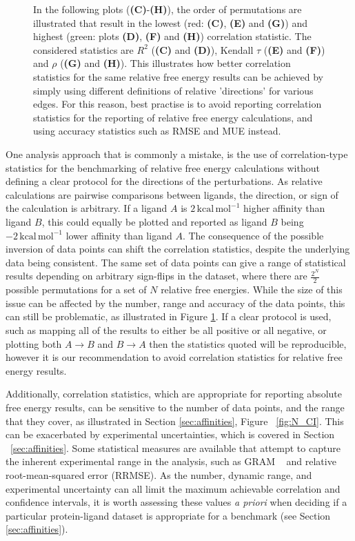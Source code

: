 \documentclass[9pt,bestpractices]{livecoms}
\begin{document}
\begin{figure}
{    %
    In the following plots (\textbf{(C)}-\textbf{(H)}), the order of permutations are illustrated that result in the lowest (red: \textbf{(C)}, \textbf{(E)} and \textbf{(G)}) and highest (green: plots \textbf{(D)}, \textbf{(F)} and \textbf{(H)}) correlation statistic. 
    The considered statistics are $R^2$ (\textbf{(C)} and \textbf{(D)}), Kendall $\tau$ (\textbf{(E)} and \textbf{(F)}) and $\rho$ (\textbf{(G)} and \textbf{(H)}).
    This illustrates how better correlation statistics for the same relative free energy results can be achieved by simply using different definitions of relative 'directions' for various edges. 
    For this reason, best practise is to avoid reporting correlation statistics for the reporting of relative free energy calculations, and using accuracy  statistics such as RMSE and MUE instead.}
    \label{fig:changing-corr}
\end{figure}

One analysis approach that is commonly a mistake, is the use of correlation-type statistics for the benchmarking of relative free energy calculations without defining a clear protocol for the directions of the perturbations. As relative calculations are pairwise comparisons between ligands, the direction, or sign of the calculation is arbitrary. If a ligand $A$ is $2\,\mathrm{kcal\,mol^{-1}}$ higher affinity than ligand $B$, this could equally be plotted and reported as ligand $B$ being $-2\,\mathrm{kcal\,mol^{-1}}$ lower affinity than ligand $A$. The consequence of the possible inversion of data points can shift the correlation statistics, despite the underlying data being consistent. The same set of data points can give a range of statistical results depending on arbitrary sign-flips in the dataset, where there are $\frac{2^N}{2}$ possible permutations for a set of $N$ relative free energies. While the size of this issue can be affected by the number, range and accuracy of the data points, this can still be problematic, as illustrated in Figure \ref{fig:changing-corr}. If a clear protocol is used, such as mapping all of the results to either be all positive or all negative, or plotting both $A \rightarrow B$ and $B \rightarrow A$ then the statistics quoted will be reproducible, however it is our recommendation to avoid correlation statistics for relative free energy results.

Additionally, correlation statistics, which are appropriate for reporting absolute free energy results, can be sensitive to the number of data points, and the range that they cover, as illustrated in Section \ref{sec:affinities}, Figure ~\ref{fig:N_CI}. This can be exacerbated by experimental uncertainties, which is covered in Section ~\ref{sec:affinities}. Some statistical measures are available that attempt to capture the inherent experimental range in the analysis, such as GRAM ~\cite{cui2019gram} and relative root-mean-squared error (RRMSE). As the number, dynamic range, and experimental uncertainty can all limit the maximum achievable correlation and confidence intervals, it is worth assessing these values \textit{a priori} when deciding if a particular protein-ligand dataset is appropriate for a benchmark (see Section \ref{sec:affinities}).
\end{document}
